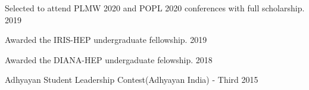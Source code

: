\documentclass[10pt, letterpaper]{deps1}
\begin{document}
%
%

%
%
\begin{tightitemize}
    \item Selected to attend PLMW 2020 and POPL 2020 conferences with full scholarship. \hfill{2019}
    \item Awarded the IRIS-HEP undergraduate fellowship. \hfill{2019}
	\item Awarded the DIANA-HEP undergaduate felowship. \hfill{2018}
	\item Adhyayan Student Leadership Contest(Adhyayan India) - Third \hfill{2015}
\end{tightitemize}
\end{document}
